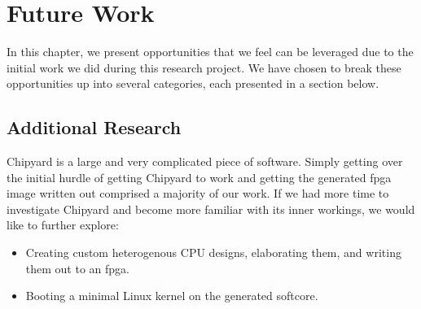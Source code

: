 \chapter{Future Work}\label{chap:Future_Work}
In this chapter, we present opportunities that we feel can be leveraged due to the initial work we did during this research project.
We have chosen to break these opportunities up into several categories, each presented in a section below.

\section{Additional Research}\label{sec:Additional_Research}
Chipyard is a large and very complicated piece of software.
Simply getting over the initial hurdle of getting Chipyard to work and getting the generated \Gls{fpga} image written out comprised a majority of our work.
If we had more time to investigate Chipyard and become more familiar with its inner workings, we would like to further explore:
\begin{itemize}
\item Creating custom heterogenous CPU designs, elaborating them, and writing them out to an \Gls{fpga}.
\item Booting a minimal Linux kernel on the generated \gls{softcore}.
\end{itemize}


